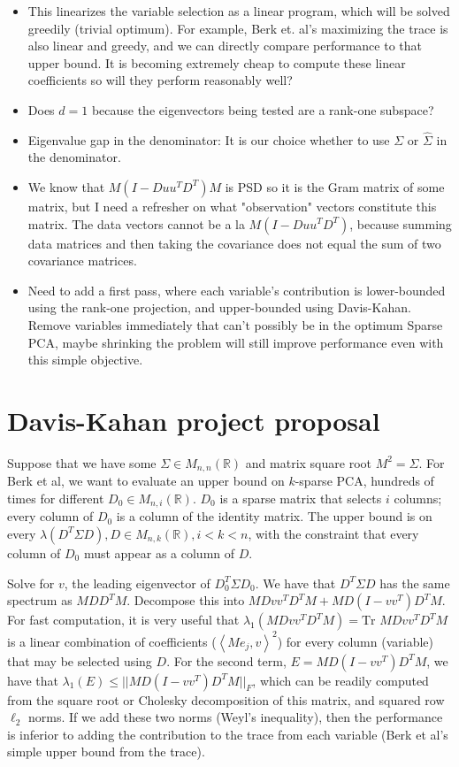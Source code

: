 \documentclass{article}
\begin{document}
\begin{itemize}
    \item This linearizes the variable selection as a linear program, which will be solved greedily (trivial optimum). For example, Berk et. al's maximizing the trace is also linear and greedy, and we can directly compare performance to that upper bound. It is becoming extremely cheap to compute these linear coefficients so will they perform reasonably well?
    \item Does $d=1$ because the eigenvectors being tested are a rank-one subspace?
    \item Eigenvalue gap in the denominator: It is our choice whether to use $\Sigma$ or $\hat{\Sigma}$ in the denominator.
    \item We know that $M(I-Duu^TD^T)M$ is PSD so it is the Gram matrix of some matrix, but I need a refresher on what "observation" vectors constitute this matrix. The data vectors cannot be a la $M(I-Duu^TD^T)$, because summing data matrices and then taking the covariance does not equal the sum of two covariance matrices.
    \item Need to add a first pass, where each variable's contribution is lower-bounded using the rank-one projection, and upper-bounded using Davis-Kahan. Remove variables immediately that can't possibly be in the optimum Sparse PCA, maybe shrinking the problem will still improve performance even with this simple objective.
\end{itemize}

\section{Davis-Kahan project proposal}

Suppose that we have some $\Sigma \in M_{n,n}(\mathbb{R})$ and matrix square root $M^2 = \Sigma$. For Berk et al, we want to evaluate an upper bound on $k$-sparse PCA, hundreds of times for different $D_0 \in M_{n,i}(\mathbb{R})$. $D_0$ is a sparse matrix that selects $i$ columns; every column of $D_0$ is a column of the identity matrix. The upper bound is on every $\lambda(D^T \Sigma D), D \in M_{n,k}(\mathbb{R}), i < k < n$, with the constraint that every column of $D_0$ must appear as a column of $D$.

Solve for $v$, the leading eigenvector of $D_0^T \Sigma D_0$. We have that $D^T\Sigma D$ has the same spectrum as $M D D^T M$. Decompose this into $M D v v^T D^T M + M D (I - vv^T) D^T M$. For fast computation, it is very useful that $\lambda_1(MDvv^T D^T M) = \text{Tr }MDvv^T D^T M$ is a linear combination of coefficients ($\left< M e_j, v \right>^2$) for every column (variable) that may be selected using $D$. For the second term, $E = MD(I-vv^T) D^T M$, we have that $\lambda_1(E) \le ||MD(I - vv^T) D^T M||_F$, which can be readily computed from the square root or Cholesky decomposition of this matrix, and squared row $\ell_2$ norms. If we add these two norms (Weyl's inequality), then the performance is inferior to adding the contribution to the trace from each variable (Berk et al's simple upper bound from the trace).
\end{document}
